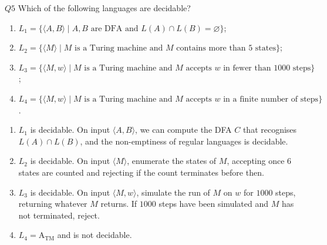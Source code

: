 \documentclass{article}
\theoremstyle{definition}
\theoremstyle{definition}
\theoremstyle{remark}
\begin{document}
\begin{questionbox}{$Q5$}
    Which of the following languages are decidable?
    \begin{enumerate}
        \item[$(i)$] $L_1=\bigl\{\langle A,B\rangle\mid A,B\text{ are DFA and }L(A)\cap L(B)=\varnothing\bigr\}$;
        
        \item[$(ii)$] $L_2=\bigl\{\langle M\rangle\mid M\text{ is a Turing machine and }M\text{ contains more than 5 states}\bigr\}$;
        
        \item[$(iii)$] $L_3=\bigl\{\langle M,w\rangle\mid M\text{ is a Turing machine and }M\text{ accepts }w\text{ in fewer than }1000\text{ steps}\bigr\}$;
        
        \item[$(iv)$] $L_4=\bigl\{\langle M,w\rangle\mid M\text{ is a Turing machine and }M\text{ accepts }w\text{ in a finite number of steps}\bigr\}$.
    \end{enumerate}
\end{questionbox}

\bigskip

\begin{enumerate}
    \item[$(i)$] $L_1$ is decidable. On input $\langle A,B\rangle$, we can compute the DFA $C$ that recognises $L(A)\cap L(B)$, and the non-emptiness of regular languages is decidable.
    
    
    \item[$(ii)$] $L_2$ is decidable. On input $\langle M\rangle$, enumerate the states of $M$, accepting once $6$ states are counted and rejecting if the count terminates before then.

    \item[$(iii)$] $L_3$ is decidable. On input $\langle M,w\rangle$, simulate the run of $M$ on $w$ for $1000$ steps, returning whatever $M$ returns. If $1000$ steps have been simulated and $M$ has not terminated, reject.

    \item[$(iv)$] $L_4=\text{A}_{\text{TM}}$ and is not decidable.
\end{enumerate}
\end{document}
